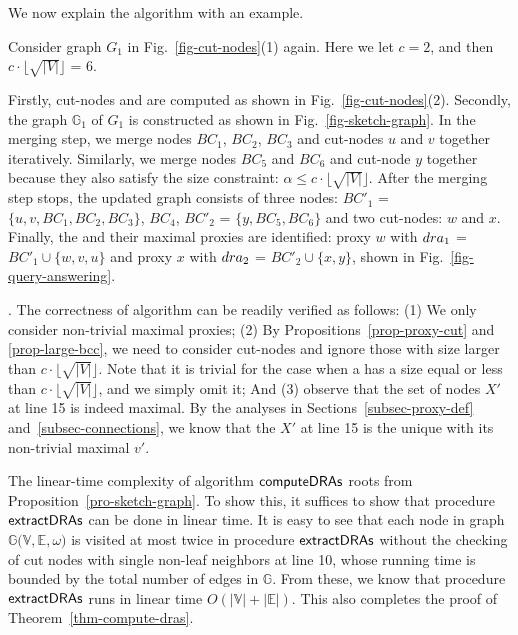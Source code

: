 We now explain the algorithm with an example.

\vspace{-0.5ex}
\begin{example}
\label{exm-compute-proxies} Consider graph $G_1$ in Fig.~\ref{fig-cut-nodes}(1) again. Here we let $c = 2$, and then $c\cdot\lfloor\sqrt{|V|}\rfloor$ = $6$.

Firstly, cut-nodes and \bccs are computed as shown in Fig.~\ref{fig-cut-nodes}(2).
Secondly, the \bcsketch graph $\mathbb{G}_1$ of $G_1$ is constructed as shown in Fig.~\ref{fig-sketch-graph}. In the merging step, we merge \bc nodes $BC_1$, $BC_2$, $BC_3$ and cut-nodes $u$ and $v$ together iteratively. Similarly, we merge \bc nodes $BC_5$ and $BC_6$ and cut-node $y$ together because they also satisfy the size constraint: $\alpha \leq c\cdot\lfloor\sqrt{|V|}\rfloor$.
After the merging step stops, the updated \bcsketch graph consists of three \bc nodes:
$BC'_1$ = $\{u, v, BC_1, BC_2, BC_3\}$, $BC_4$, $BC'_2$ = $\{y, BC_5, BC_6\}$ and two cut-nodes: $w$ and $x$.
Finally, the \dras and their maximal proxies are identified: proxy $w$ with ${\sc dra}_1$ = $BC'_1\cup\{w, v, u\}$ and proxy $x$ with  ${\sc dra}_2$ = $BC'_2\cup\{x, y\}$, shown in Fig.~\ref{fig-query-answering}.
\end{example}
\vspace{-0.5ex}

\vspace{-1ex}
. The correctness of algorithm \compDRAs can be readily verified as follows:
(1) We only consider non-trivial maximal proxies; (2) By Propositions~\ref{prop-proxy-cut} and \ref{prop-large-bcc}, we need to consider cut-nodes and ignore those \bccs with size larger than $c\cdot\lfloor\sqrt{|V|}\rfloor$. Note that it is trivial for the case when a \cc has a size equal or less than $c\cdot\lfloor\sqrt{|V|}\rfloor$, and we simply omit it; And (3) observe that the set of nodes $X'$ at line 15 is indeed maximal. By the analyses in Sections~\ref{subsec-proxy-def} and~\ref{subsec-connections}, we know that the $X'$ at line 15 is the unique \dra with its non-trivial  maximal $v'$.


The linear-time complexity of algorithm ${\mathsf{computeDRAs}}$ roots from Proposition~\ref{pro-sketch-graph}.
To show this, it suffices to show that procedure ${\mathsf{extractDRAs}}$ can be done in linear time.
It is easy to see that each node in \bcsketch graph $\mathbb{G(V, E}, \omega)$ is visited at most twice in procedure ${\mathsf{extractDRAs}}$ without the checking of cut nodes with single non-leaf neighbors at line 10, whose running time is bounded by the total number of edges in $\mathbb{G}$.
From these, we know that procedure ${\mathsf{extractDRAs}}$ runs in linear time $O(|\mathbb{V}|+|\mathbb{E}|)$.
%
This also completes the proof of Theorem~\ref{thm-compute-dras}.


